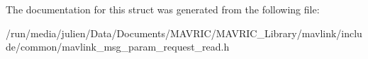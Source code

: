The documentation for this struct was generated from the following file\+:\begin{DoxyCompactItemize}
\item 
/run/media/julien/\+Data/\+Documents/\+M\+A\+V\+R\+I\+C/\+M\+A\+V\+R\+I\+C\+\_\+\+Library/mavlink/include/common/mavlink\+\_\+msg\+\_\+param\+\_\+request\+\_\+read.\+h\end{DoxyCompactItemize}
